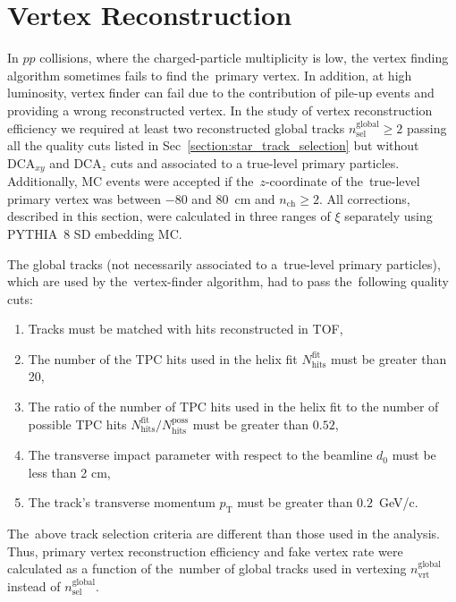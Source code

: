\section{Vertex Reconstruction}\label{section:star_vertex}

In $pp$ collisions, where the charged-particle multiplicity is low, the vertex finding algorithm sometimes fails to find the~primary vertex. In addition, at high luminosity, vertex finder can fail due to the contribution of pile-up events and providing a wrong reconstructed vertex. In the study of vertex reconstruction efficiency we required at least two reconstructed global tracks $n^\textrm{global}_\textrm{sel}\geq 2$ passing all the quality cuts listed in Sec~\ref{section:star_track_selection} but without $\textrm{DCA}_{xy}$ and $\textrm{DCA}_{z}$ cuts and  associated to a true-level primary particles.  Additionally, MC events were accepted if the~$z$-coordinate of the~true-level primary vertex was between $-80$ and $80$~cm and $n_\textrm{ch}\geq 2$. All corrections, described in this section, were calculated in three ranges of $\xi$ separately using PYTHIA~8 \ac{SD} embedding \ac{MC}.

The global tracks (not necessarily associated to a~true-level primary particles), which are used by the~vertex-finder algorithm, had to pass the~following quality cuts:
\begin{enumerate}
	\item Tracks must be matched with hits reconstructed in TOF,
	\item The number of the TPC hits used in the helix fit $N_\textrm{hits}^\textrm{fit}$ must be greater than 20,
	\item The ratio of the number of TPC hits used in the helix fit to the number of possible TPC hits $N_\textrm{hits}^\textrm{fit}/N_\textrm{hits}^\textrm{poss}$ must be greater than $0.52$,
	\item The transverse impact parameter with respect to the beamline $d_0$ must be less than 2 cm,
	\item The track's transverse momentum $p_\textrm{T}$ must be greater than $0.2$~GeV/c.
\end{enumerate}
 The~above track selection criteria are different than those used in the analysis. Thus, primary vertex reconstruction efficiency and fake vertex rate were calculated as a function of the~number of global tracks used in vertexing $n^\textrm{global}_\textrm{vrt}$ instead of $n^\textrm{global}_\textrm{sel}$. 

